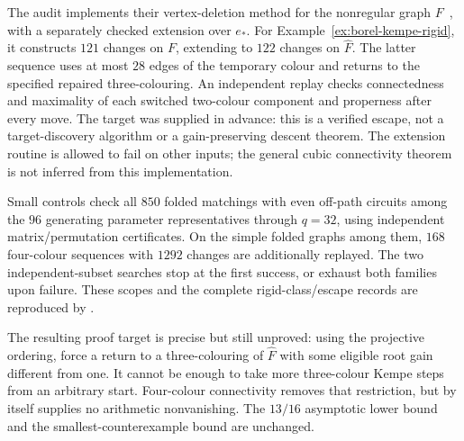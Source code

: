 \documentclass[11pt,a4paper]{article}
\theoremstyle{definition}
\theoremstyle{remark}
\begin{document}
The audit implements their vertex-deletion method for the nonregular graph $F$~\cite[Lemma~7]{McDonaldMoharScheide12}, with a separately checked extension over $e_*$.  For Example~\ref{ex:borel-kempe-rigid}, it constructs $121$ changes on $F$, extending to $122$ changes on $\widehat F$.  The latter sequence uses at most $28$ edges of the temporary colour and returns to the specified repaired three-colouring.  An independent replay checks connectedness and maximality of each switched two-colour component and properness after every move.  The target was supplied in advance: this is a verified escape, not a target-discovery algorithm or a gain-preserving descent theorem.  The extension routine is allowed to fail on other inputs; the general cubic connectivity theorem is not inferred from this implementation.

Small controls check all $850$ folded matchings with even off-path circuits among the $96$ generating parameter representatives through $q=32$, using independent matrix/permutation certificates.  On the simple folded graphs among them, $168$ four-colour sequences with $1292$ changes are additionally replayed.  The two independent-subset searches stop at the first success, or exhaust both families upon failure.  These scopes and the complete rigid-class/escape records are reproduced by .

The resulting proof target is precise but still unproved: using the projective ordering, force a return to a three-colouring of $\widehat F$ with some eligible root gain different from one.  It cannot be enough to take more three-colour Kempe steps from an arbitrary start.  Four-colour connectivity removes that restriction, but by itself supplies no arithmetic nonvanishing.  The $13/16$ asymptotic lower bound and the smallest-counterexample bound are unchanged.
\end{document}
